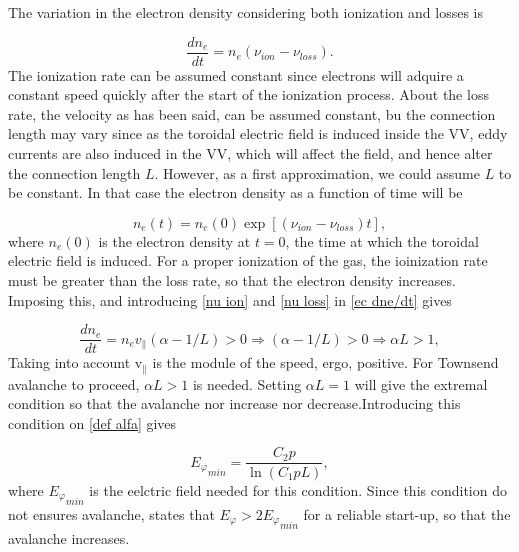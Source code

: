 \documentclass[a4paper,12pt,oneside]{book}
\begin{document}
The variation in the electron density considering both ionization and losses is

\begin{equation}\label{ec dne/dt}
\dfrac{d n_e}{dt}=n_e (\nu_{ion}-\nu_{loss}).
\end{equation}
The ionization rate can be assumed constant since electrons will adquire a constant speed quickly after the start of the ionization process. About the loss rate, the velocity as has been said, can be assumed constant, bu the connection length may vary since as the toroidal electric field is induced inside the VV, eddy currents are also induced in the VV, which will affect the field, and hence alter the connection length $L$. However, as a first approximation, we could assume $L$ to be constant. In that case the electron density as a function of time will be

\begin{equation}\label{ec ne}
n_e(t)=n_e(0)\exp{ [(\nu_{ion}-\nu_{loss})t]},
\end{equation}
where $n_e(0)$ is the electron density at $t=0$, the time at which the toroidal electric field is induced. For a proper ionization of the gas, the ioinization rate must be greater than the loss rate, so that the electron density increases. Imposing this, and introducing \eqref{nu ion} and \eqref{nu loss} in \eqref{ec dne/dt} gives

\begin{equation}
\dfrac{d n_e}{dt}=n_e v_{\parallel}(\alpha-1/L)>0 \Rightarrow (\alpha-1/L)>0 \Rightarrow \alpha L>1,
\end{equation}
Taking into account v$_{\parallel}$ is the module of the speed, ergo, positive. For Townsend avalanche to proceed, $\alpha L>1$ is needed. Setting $\alpha L=1$  will give the extremal condition so that the avalanche nor increase nor decrease.Introducing this condition on \eqref{def alfa} gives

\begin{equation}\label{ec Paschen}
{E_\varphi}_{min}=\dfrac{C_2 p}{\ln(C_1 p L)},
\end{equation}
where ${E_\varphi}_{min}$ is the eelctric field needed for this condition. Since this condition do not ensures avalanche, \cite{ITER_2007} states that $E_\varphi>2{E_\varphi}_{min}$ for a reliable start-up, so that the avalanche increases. 
\end{document}
